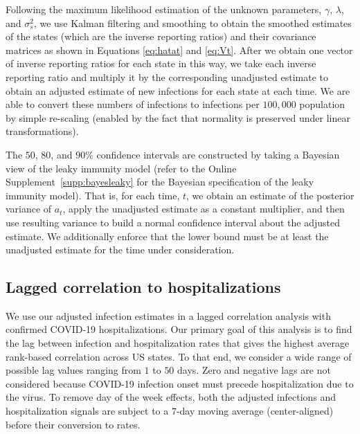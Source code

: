 \documentclass{article}
\begin{document}
Following the maximum likelihood estimation of the unknown parameters, $\gamma$, $\lambda$, and $\sigma^2_s$, we use Kalman filtering and smoothing to obtain the smoothed estimates of the states (which are the inverse reporting ratios) and their covariance matrices as shown in Equations \ref{eq:hatat} and \ref{eq:Vt}. After we obtain one vector of inverse reporting ratios for each state in this way, we take each inverse reporting ratio and multiply it by the corresponding unadjusted estimate to obtain an adjusted estimate of new infections for each state at each time. We are able to convert these numbers of infections to infections per $100,000$ population by simple re-scaling (enabled by the fact that normality is preserved under linear transformations).

The $50$, $80$, and $90\%$ confidence intervals are constructed by taking a Bayesian view of the leaky immunity model (refer to the Online Supplement~\ref{supp:bayesleaky} for the Bayesian specification of the leaky immunity model). That is, for each time, $t$, we obtain an estimate of the posterior variance of $a_t$, apply the unadjusted estimate as a constant multiplier, and then use resulting variance to build a normal confidence interval about the adjusted estimate. We additionally enforce that the lower bound must be at least the unadjusted estimate for the time under consideration.

\subsection{Lagged correlation to hospitalizations} We use our adjusted infection estimates in a lagged correlation analysis with confirmed COVID-19 hospitalizations. Our primary goal of this analysis is to find the lag between infection and hospitalization rates that gives the highest average rank-based correlation across US states. To that end, we consider a wide range of possible lag values ranging from $1$ to $50$ days. Zero and negative lags are not considered because COVID-19 infection onset must precede hospitalization due to the virus. To remove day of the week effects, both the adjusted infections and hospitalization signals are subject to a $7$-day moving average (center-aligned) before their conversion to rates.
\end{document}
